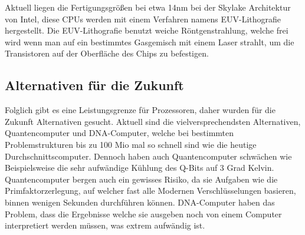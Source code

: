 Aktuell liegen die Fertigungsgrößen bei etwa 14nm bei der Skylake Architektur von Intel, diese CPUs werden mit einem Verfahren namens EUV-Lithografie hergestellt. Die EUV-Lithografie benutzt weiche Röntgenstrahlung,
welche frei wird wenn man auf ein bestimmtes Gasgemisch mit einem Laser strahlt, um die Transistoren auf der Oberfläche des Chips zu befestigen.


\subsection{Alternativen für die Zukunft}

Folglich gibt es eine Leistungsgrenze für Prozessoren, daher wurden für die Zukunft Alternativen gesucht.
Aktuell sind die vielversprechendsten Alternativen, Quantencomputer und DNA-Computer, welche bei bestimmten Problemstrukturen bis zu 100 Mio mal so schnell sind wie die heutige Durchschnittscomputer.
Dennoch haben auch Quantencomputer schwächen wie Beispielsweise die sehr aufwändige Kühlung des Q-Bits auf 3 Grad Kelvin.
Quantencomputer bergen auch ein gewisses Risiko, da sie Aufgaben wie die Primfaktorzerlegung, auf welcher fast alle Modernen Verschlüsselungen basieren, binnen wenigen Sekunden durchführen können.
DNA-Computer haben das Problem, dass die Ergebnisse welche sie ausgeben noch von einem Computer interpretiert werden müssen, was extrem aufwändig ist.

